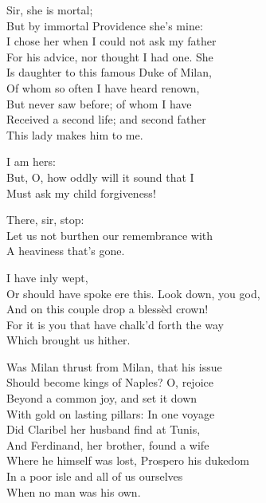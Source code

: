 \begin{verse_speech}[Ferdinand] 
Sir, she is mortal;\\
But by immortal Providence she's mine:\\
I chose her when I could not ask my father\\
For his advice, nor thought I had one. She\\
Is daughter to this famous Duke of Milan,\\
Of whom so often I have heard renown,\\
But never saw before; of whom I have\\
Received a second life; and second father\\
This lady makes him to me.
\end{verse_speech}

\begin{verse_speech}[Alonso] 
I am hers:\\
But, O, how oddly will it sound that I\\
Must ask my child forgiveness!
\end{verse_speech}

\begin{verse_speech}[Prospero] 
There, sir, stop:\\
Let us not burthen our remembrance with\\
A heaviness that's gone.
\end{verse_speech}

\begin{verse_speech}[Gonzalo] 
\hspace{\widthof{}}I have inly wept,\\
Or should have spoke ere this. Look down, you god,\\
And on this couple drop a blessèd crown!\\
For it is you that have chalk'd forth the way\\
Which brought us hither.
\end{verse_speech}


\begin{verse_speech}[Gonzalo] 
Was Milan thrust from Milan, that his issue\\
Should become kings of Naples? O, rejoice\\
Beyond a common joy, and set it down\\
With gold on lasting pillars: In one voyage\\
Did Claribel her husband find at Tunis,\\
And Ferdinand, her brother, found a wife\\
Where he himself was lost, Prospero his dukedom\\
In a poor isle and all of us ourselves\\
When no man was his own.
\end{verse_speech}

